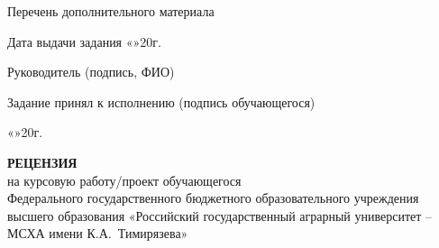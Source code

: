 \documentclass[14pt,a4paper]{extreport}
\begin{document}
\begin{singlespacing}
\vspace{0.3em}
\noindent\underline{\hspace{\textwidth}}

\vspace{0.3em}
\noindent\underline{\hspace{\textwidth}}

\vspace{0.3em}
\noindent\underline{\hspace{\textwidth}}

\vspace{0.3em}
\noindent\underline{\hspace{\textwidth}}

\vspace{0.3em}
\noindent\underline{\hspace{\textwidth}}

\vspace{0.5em}
\noindent Перечень дополнительного материала\underline{\hspace{6.5cm}}

\vspace{0.3em}
\noindent\underline{\hspace{\textwidth}}

\vspace{0.3em}
\noindent\underline{\hspace{\textwidth}}

\vspace{0.3em}
\noindent\underline{\hspace{\textwidth}}

\vspace{1em}
\noindent Дата выдачи задания \hfill «\underline{\;\;\;}»\underline{\hspace{3cm}}20\underline{\;\;\;}г.

\vspace{1em}
\noindent Руководитель (подпись, ФИО)\hfill\underline{\hspace{4cm}}

\vspace{1em}
\noindent Задание принял к исполнению (подпись обучающегося)\hfill\underline{\hspace{4cm}}

\vspace{0.5em}
\noindent\hfill«\underline{\;\;\;}»\underline{\hspace{3cm}}20\underline{\;\;\;}г.

\newpage
\thispagestyle{empty}
\begin{center}
  \textbf{РЕЦЕНЗИЯ}\\[0.3em]
  на курсовую работу/проект обучающегося\\[0.3em]
  Федерального государственного бюджетного образовательного учреждения
  высшего образования «Российский государственный аграрный университет
  -- МСХА имени К.А.~Тимирязева»
\end{center}


\end{singlespacing}
\end{document}
